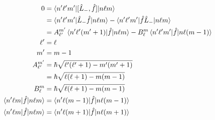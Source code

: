 \documentclass{article}
\begin{document}
\begin{align*}
  0                                       & = \braket{n' \ell' m' | [\hat{L}_-, \hat{f}] | n \ell m}                                                                    \\
                                          & = \braket{n' \ell' m' | \hat{L}_- \hat{f} | n \ell m} - \braket{n' \ell' m' | \hat{f} \hat{L}_- | n \ell m}                 \\
                                          & = A_{\ell'}^{m'} \braket{n' \ell' (m' + 1) | \hat{f} | n \ell m} - B_\ell^m \braket{n' \ell' m' | \hat{f} | n \ell (m - 1)} \\
  \ell'                                   & = \ell                                                                                                                      \\
  m'                                      & = m - 1                                                                                                                     \\
  A_{\ell'}^{m'}                          & = \hbar \sqrt{\ell' (\ell' + 1) - m' (m' + 1)}                                                                              \\
                                          & = \hbar \sqrt{\ell (\ell + 1) - m (m - 1)}                                                                                  \\
  B_\ell^m                                & = \hbar \sqrt{\ell (\ell + 1) - m (m - 1)}                                                                                  \\
  \braket{n' \ell m | \hat{f} | n \ell m} & = \braket{n' \ell (m - 1) | \hat{f} | n \ell (m - 1)}                                                                       \\
  \braket{n' \ell m | \hat{f} | n \ell m} & = \braket{n' \ell (m + 1) | \hat{f} | n \ell (m + 1)}
\end{align*}

\subsection{}
\end{document}
